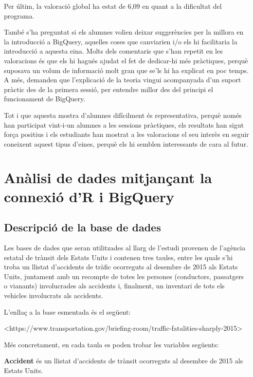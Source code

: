 \documentclass[11pt,longbibliography]{article}
\theoremstyle{definition}
\theoremstyle{remark}
\begin{document}
Per últim, la valoració global ha estat de 6,09 en quant a la dificultat del programa.


També s'ha preguntat si els alumnes volien deixar suggerències per la millora en la introducció a BigQuery, aquelles coses que canviarien i/o els hi facilitaria la introducció a aquesta eina. Molts dels comentaris que s'han repetit en les valoracions és que els hi hagués ajudat el fet de dedicar-hi més pràctiques, perquè suposava un volum de informació molt gran que se'ls hi ha explicat en poc temps. A més, demanden que l'explicació de la teoria vingui acompanyada d'un suport pràctic des de la primera sessió, per entendre millor des del principi el funcionament de BigQuery.


Tot i que aquesta mostra d'alumnes difícilment és representativa, perquè només han participat vint-i-un alumnes a les sessions pràctiques, els resultats han sigut força positius i els estudiants han mostrat a les valoracions el seu interès en seguir coneixent aquest tipus d'eines, perquè els hi semblen interessants de cara al futur.

\newpage

\section{Anàlisi de dades mitjançant la connexió d'R i BigQuery}

\subsection{Descripció de la base de dades}

Les bases de dades que seran utilitzades al llarg de l'estudi provenen de l'agència estatal de trànsit dels Estats Units i contenen tres taules, entre les quals s'hi troba un llistat d’accidents de tràfic ocorreguts al desembre de 2015 als Estats Units, juntament amb un recompte de totes les persones (conductors, passatgers o vianants) involucrades als accidents i, finalment, un inventari de tots els vehicles involucrats als accidents. 


L'enllaç a la base esmentada és el següent: 

<https://www.transportation.gov/briefing-room/traffic-fatalities-sharply-2015>


Més concretament, en cada taula es poden trobar les variables següents:


\textbf{Accident} és un llistat d’accidents de trànsit ocorreguts al desembre de 2015 als Estats Units.
\end{document}
